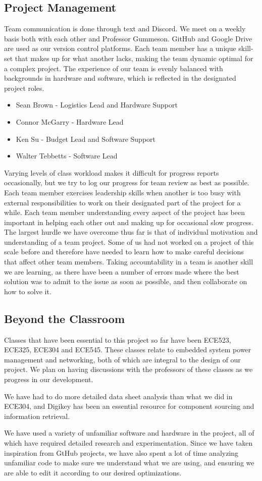 \documentclass[conference]{IEEEtran}
\begin{document}
\subsection{Project Management}
Team communication is done through text and Discord. We meet on a weekly 
basis both with each other and Professor Gummeson. GitHub and Google Drive 
are used as our version control platforms. Each team member has a unique 
skill-set that makes up for what another lacks, making the team dynamic 
optimal for a complex project. The experience of our team is evenly balanced 
with backgrounds in hardware and software, which is reflected in the 
designated project roles. 

\begin{itemize}
    \item Sean Brown - Logistics Lead and Hardware Support
    \item Connor McGarry - Hardware Lead
    \item Ken Su - Budget Lead and Software Support
    \item Walter Tebbetts - Software Lead
\end{itemize}

Varying levels of class workload makes it difficult for progress reports 
occasionally, but we try to log our progress for team review as best as 
possible. Each team member exercises leadership skills when another is too 
busy with external responsibilities to work on their designated part of the 
project for a while. Each team member understanding every aspect of the 
project has been important in helping each other out and making up for 
occasional slow progress. The largest hurdle we have overcome thus far is 
that of individual motivation and understanding of a team project. Some of 
us had not worked on a project of this scale before and therefore have 
needed to learn how to make careful decisions that affect other team members. 
Taking accountability in a team is another skill we are learning, as there 
have been a number of errors made where the best solution was to admit to 
the issue as soon as possible, and then collaborate on how to solve it. 

\subsection{Beyond the Classroom}
Classes that have been essential to this project so far have been ECE523, 
ECE325, ECE304 and ECE545. These classes relate to embedded system power 
management and networking, both of which are integral to the design of our 
project. We plan on having discussions with the professors of these classes 
as we progress in our development.

We have had to do more detailed data sheet analysis than what we did in 
ECE304, and Digikey has been an essential resource for component sourcing 
and information retrieval. 

We have used a variety of unfamiliar software and hardware in the project, 
all of which have required detailed research and experimentation. Since we 
have taken inspiration from GtHub projects, we have also spent a lot of time 
analyzing unfamiliar code to make sure we understand what we are using, and 
ensuring we are able to edit it according to our desired optimizations. 
\end{document}
